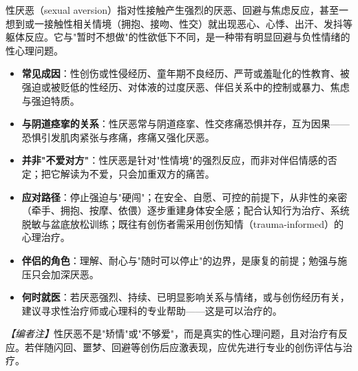 性厌恶（sexual aversion）指对性接触产生强烈的厌恶、回避与焦虑反应，甚至一想到或一接触性相关情境（拥抱、接吻、性交）就出现恶心、心悸、出汗、发抖等躯体反应。它与"暂时不想做"的性欲低下不同，是一种带有明显回避与负性情绪的性心理问题。

\begin{itemize}
	\item \textbf{常见成因}：性创伤或性侵经历、童年期不良经历、严苛或羞耻化的性教育、被强迫或被贬低的性经历、对体液的过度厌恶、伴侣关系中的控制或暴力、焦虑与强迫特质。
	\item \textbf{与阴道痉挛的关系}：性厌恶常与阴道痉挛、性交疼痛恐惧并存，互为因果——恐惧引发肌肉紧张与疼痛，疼痛又强化厌恶。
	\item \textbf{并非"不爱对方"}：性厌恶是针对"性情境"的强烈反应，而非对伴侣情感的否定；把它解读为不爱，只会加重双方的痛苦。
	\item \textbf{应对路径}：停止强迫与"硬闯"；在安全、自愿、可控的前提下，从非性的亲密（牵手、拥抱、按摩、依偎）逐步重建身体安全感；配合认知行为治疗、系统脱敏与盆底放松训练；既往有创伤者需采用创伤知情（trauma-informed）的心理治疗。
	\item \textbf{伴侣的角色}：理解、耐心与"随时可以停止"的边界，是康复的前提；勉强与施压只会加深厌恶。
	\item \textbf{何时就医}：若厌恶强烈、持续、已明显影响关系与情绪，或与创伤经历有关，建议寻求性治疗师或心理科的专业帮助——这是可以治疗的。
\end{itemize}

\noindent\textit{【编者注】}性厌恶不是"矫情"或"不够爱"，而是真实的性心理问题，且对治疗有反应。若伴随闪回、噩梦、回避等创伤后应激表现，应优先进行专业的创伤评估与治疗。
